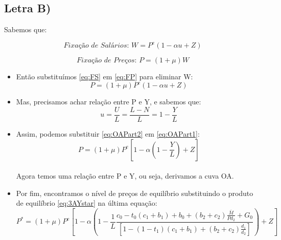 \documentclass{article}
\begin{document}
\subsection*{Letra B)}
Sabemos que:

\begin{equation}
    \textit{Fixação de Salários: } W = P^{e}(1 - \alpha u + Z)
    \label{eq:FS}
\end{equation}

\begin{equation}
    \textit{Fixação de Preços: } P=(1+ \mu )W
    \label{eq:FP}
\end{equation}

\begin{itemize}
    \item \begin{text}
            Então substituímos \eqref{eq:FS} em \eqref{eq:FP} para eliminar W:\\
            \begin{equation}
                P=(1+ \mu)P^{e}(1 - \alpha u + Z)
                \label{eq:OAPart1}
            \end{equation}
        \end{text}
    
    \item \begin{text}
            Mas, precisamos achar relação entre P e Y, e sabemos que:\\
            \begin{equation}
                u = \frac{U}{L} = \frac{L-N}{L} = 1 - \frac{Y}{L}
                \label{eq:OAPart2}
            \end{equation}
        \end{text}
        
    \item \begin{text}
            Assim, podemos substituir \eqref{eq:OAPart2} em \eqref{eq:OAPart1}:\\
            \begin{equation}
                P=(1+ \mu)P^{e}\left[1 - \alpha \left(1-\frac{Y}{L} \right) + Z\right]
                \label{eq:OAPart3}
            \end{equation}\\
            Agora temos uma relação entre P e Y, ou seja, derivamos a cuva OA.
        \end{text}
    \item \begin{text}
        Por fim, encontramos o nível de preços de equilíbrio substituindo  o produto de equilíbrio \eqref{eq:3AYstar} na última equação:
        \begin{equation}
            P^*=(1+ \mu)P^{e}\left[1 - \alpha \left(1-\frac{1}{L}\frac{c_0 -t_0(c_1+b_1) + b_0 + (b_2 +c_2)\frac{\bar{M}}{Pd_2} + G_0}{\left[1-(1-t_1)(c_1+b_1)+(b_2 +c_2) \frac{d_1}{d_2} \right]}  \right) + Z\right]
        \end{equation}
    \end{text}
\end{itemize}
\end{document}
